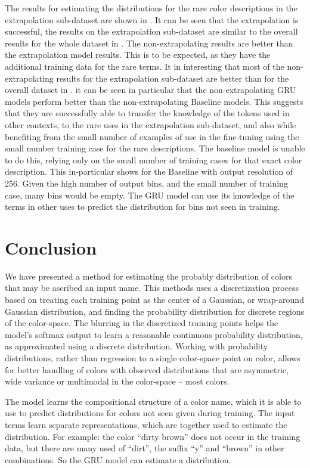 \documentclass[11pt,letterpaper]{article}
\begin{document}
The results for estimating the distributions for the rare color descriptions in the extrapolation sub-dataset are shown in .
It can be seen that the extrapolation is successful, the results on the extrapolation sub-dataset are similar to the overall results for the whole dataset in .
The non-extrapolating results are better than the extrapolation model results.
This is to be expected, as they have the additional training data for the rare terms.
It in interesting that most of the non-extrapolating results for the extrapolation sub-dataset are better than for the overall dataset in .
it can be seen in particular that the non-extrapolating GRU models perform better than the non-extrapolating Baseline models.
This suggests that they are successfully able to transfer the knowledge of the tokens used in other contexts, to the rare uses in the extrapolation sub-dataset, and also while benefiting from the small number of examples of use in the fine-tuning using the small number training case for the rare descriptions.
The baseline model is unable to do this, relying only on the small number of training cases for that exact color description.
This in-particular shows for the Baseline with output resolution of 256.
Given the high number of output bins, and the small number of training case, many bins would be empty.
The GRU model can use its knowledge of the terms in other uses to predict the distribution for bins not seen in training.




\section{Conclusion}
We have presented a method for estimating the probably distribution of colors that may be ascribed an input name.
This methods uses a discretization process based on treating each training point as the center of a Gaussian, or wrap-around Gaussian distribution, and finding the probability distribution for discrete regions of the color-space.
The blurring in the discretized training points helps the model's softmax output to learn a reasonable continuous probability distribution, as approximated using a discrete distribution.
Working with probability distributions, rather than regression to a single color-space point on color, allows for better handling of colors with observed distributions that are asymmetric, wide variance or multimodal in the color-space -- most colors.

The model learns the compositional structure of a color name, which it is able to use to predict distributions for colors not seen given during training.
The input terms learn separate representations, which are together used to estimate the distribution.
For example: the color ``dirty brown'' does not occur in the training data, but there are many used of ``dirt'', the suffix ``y'' and ``brown'' in other combinations.
So the GRU model can estimate a distribution.
\end{document}
